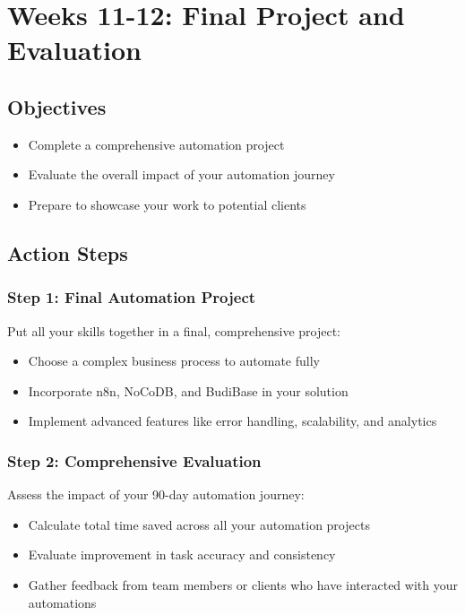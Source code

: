 
\section{Weeks 11-12: Final Project and Evaluation}

\subsection{Objectives}
\begin{itemize}
    \item Complete a comprehensive automation project
    \item Evaluate the overall impact of your automation journey
    \item Prepare to showcase your work to potential clients
\end{itemize}

\subsection{Action Steps}

\subsubsection{Step 1: Final Automation Project}
Put all your skills together in a final, comprehensive project:

\begin{itemize}
    \item Choose a complex business process to automate fully
    \item Incorporate n8n, NoCoDB, and BudiBase in your solution
    \item Implement advanced features like error handling, scalability, and analytics
\end{itemize}

\subsubsection{Step 2: Comprehensive Evaluation}
Assess the impact of your 90-day automation journey:

\begin{itemize}
    \item Calculate total time saved across all your automation projects
    \item Evaluate improvement in task accuracy and consistency
    \item Gather feedback from team members or clients who have interacted with your automations
\end{itemize}

